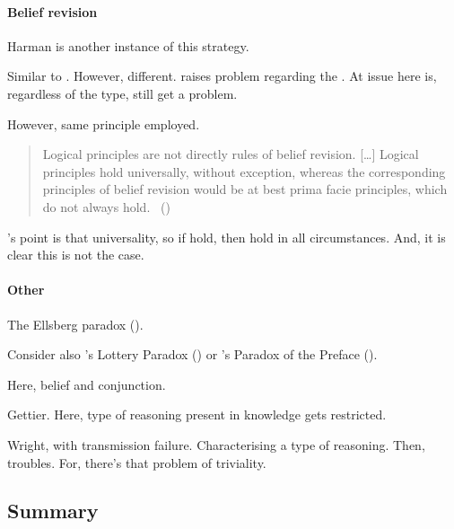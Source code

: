 \paragraph*{Belief revision}

\begin{note}
  {
    \color{red}
    Harman is another instance of this strategy.
  }

  Similar to \citeauthor{Harman:1984aa,Harman:1986ux}.
  However, different.
  \citeauthor{Harman:1986ux} raises problem regarding the \tor{}.
  At issue here is, regardless of the type, still get a problem.

  However, same principle employed.

  \begin{quote}
    Logical principles are not directly rules of belief revision.
    [\dots]
    Logical principles hold universally, without exception, whereas the corresponding principles of belief revision would be at best prima facie principles, which do not always hold.%
    \mbox{ }\hfill\mbox{(\citeyear[107--108]{Harman:1984aa})}
  \end{quote}
  \citeauthor{Harman:1984aa}'s point is that universality, so if hold, then hold in all circumstances.
  And, it is clear this is not the case.
\end{note}

\paragraph*{Other}

\begin{note}
  The Ellsberg paradox (\cite{Ellsberg:1961aa}).

  Consider also \citeauthor{Kyburg:1997aa}'s Lottery Paradox (\citeyear{Kyburg:1997aa}) or \citeauthor{Makinson:1965aa}'s Paradox of the Preface (\citeyear{Makinson:1965aa}).

  Here, belief and conjunction.

  Gettier.
  Here, type of reasoning present in knowledge gets restricted.

  Wright, with transmission failure.
  Characterising a type of reasoning.
  Then, troubles.
  For, there's that problem of triviality.
\end{note}

\subsection{Summary}

